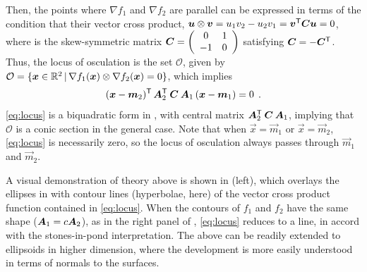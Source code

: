 Then, the points where $\nabla f_1$ and $\nabla f_2$ are parallel can be expressed in terms of the
condition that their vector cross product, 
$\bm{u} \otimes \bm{v} = u_1 v_2 - u_2 v_1 = \bm{v}^\mathsf{T} \bm{C} \bm{u} = 0$, where  is the skew-symmetric matrix 
$ \bm{C} = \left(
\begin{array}{cc}
 0 & 1 \\ -1 & 0
\end{array}
\right)
$ satisfying $\bm{C} = -\bm{C}^\mathsf{T}$.
Thus, the locus of osculation is the set $\mathcal{O}$, given by $\mathcal{O}  = \{\bm{x} \in \mathbb{R}^{2} \, | \, \nabla f_1(\bm{x}) \otimes \nabla f_2(\bm{x}) = 0 \}$,
which implies
\begin{equation}
(\bm{x}-\bm{m}_2)^\mathsf{T} \, \bm{A}_2 ^\mathsf{T} \: \bm{C} \: \bm{A}_1 \, (\bm{x}-\bm{m}_1) = 0  \:\: .  \label{eq:locus}   
\end{equation}
\eqref{eq:locus} is a biquadratic form in , with central matrix $\bm{A}_2 ^\mathsf{T} \: \bm{C} \: \bm{A}_1$,
implying that $\mathcal{O}$ is a conic section in the general case. Note that when $\vec{x}=\vec{m}_1$ or $\vec{x}=\vec{m}_2$,
\eqref{eq:locus} is necessarily zero, so the locus of osculation always passes through  $\vec{m}_1$ and $\vec{m}_2$.

A visual demonstration of theory above is
shown in  (left), which overlays the ellipses in  with contour lines 
(hyperbolae, here)
of 
the vector cross product function contained in \eqref{eq:locus}.
When the contours of $f_1$ and $f_2$ have the same shape ($\bm{A}_1 = c \bm{A}_2 $), as in the right panel of ,
\eqref{eq:locus}
reduces to a line, in accord with the stones-in-pond interpretation. 
The above can be readily extended to ellipsoids in higher dimension, where the development is more easily understood
in terms of normals to the surfaces.

